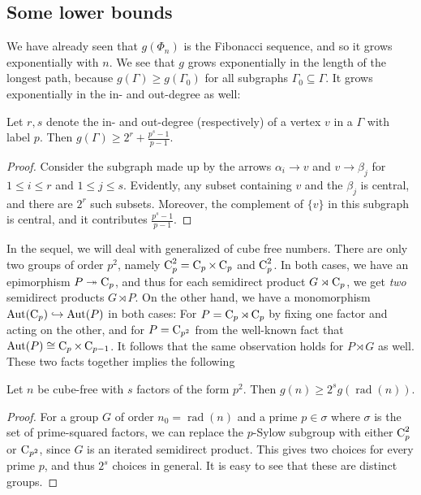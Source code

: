\subsection{Some lower bounds}
We have already seen that $g(\Phi_n)$ is the Fibonacci sequence, and so it grows exponentially with $n$. We see that $g$ grows exponentially in the length of the longest path, because $g(\Gamma) \ge  g(\Gamma_0)$ for all subgraphs $\Gamma_0 \subseteq \Gamma$. It grows exponentially in the in- and out-degree as well:
\begin{lem}
	Let $r, s$ denote the in- and out-degree (respectively) of a vertex $v$ in a  $\Gamma$ with label $p$. Then $g(\Gamma) \ge 2^r + \frac{p^s - 1}{p - 1}$.
\end{lem}
\begin{proof}
	Consider the subgraph made up by the arrows $\alpha_i \rightarrow v$ and $v \rightarrow \beta_j$ for $1 \le i \le r$ and $1 \le j \le s$. Evidently, any subset containing $v$ and the $\beta_j$ is central, and there are $2^r$ such subsets. Moreover, the complement of $\{v\}$ in this subgraph is central, and it contributes $\frac{p^s - 1}{p - 1}$.
\end{proof}
In the sequel, we will deal with generalized  of cube free numbers. There are only two groups of order $p^2$, namely $\operatorname{C}_{p}^2 = \operatorname{C}_{p} \times \operatorname{C}_{p}$ and $\operatorname{C}_{p}^2$. In both cases, we have an epimorphism $P \twoheadrightarrow \operatorname{C}_{p}$, and thus for each semidirect product $G \rtimes \operatorname{C}_{p}$, we get \textit{two} semidirect products $G \rtimes P$. On the other hand, we have a monomorphism $\operatorname{Aut}(\operatorname{C}_{p}) \hookrightarrow \operatorname{Aut}(P)$ in both cases: For $P = \operatorname{C}_{p} \rtimes \operatorname{C}_{p}$ by fixing one factor and acting on the other, and for $P = \operatorname{C}_{p^2}$ from the well-known fact that $\operatorname{Aut}(P) \cong \operatorname{C}_{p} \times \operatorname{C}_{p - 1}$. It follows that the same observation holds for $P \rtimes G$ as well. These two facts together implies the following

\begin{lem}
	Let $n$ be cube-free with $s$ factors of the form $p^2$. Then $g(n) \ge 2^s g(\operatorname{rad}(n))$.
\end{lem}
\begin{proof}
	For a group $G$ of order $n_0 = \operatorname{rad}(n)$ and a prime $p \in \sigma$ where $\sigma$ is the set of prime-squared factors, we can replace the $p$-Sylow subgroup with either $\operatorname{C}_{p}^2$ or $\operatorname{C}_{p^2}$, since $G$ is an iterated semidirect product. This gives two choices for every prime $p$, and thus $2^s$ choices in general. It is easy to see that these are distinct groups.
\end{proof}

